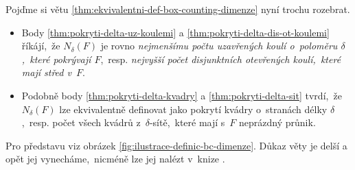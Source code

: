 Pojďme si větu \ref{thm:ekvivalentni-def-box-counting-dimenze} nyní trochu rozebrat.
\begin{itemize}
    \item Body \ref{thm:pokryti-delta-uz-koulemi} a \ref{thm:pokryti-delta-dis-ot-koulemi} říkájí,~že $N_\delta(F)$ je rovno \emph{nejmenšímu počtu uzavřených koulí o~poloměru $\delta$,~které pokrývají $F$},~resp. \emph{nejvyšší počet disjunktních otevřených koulí,~které mají střed v~$F$}.
    \item Podobně body \ref{thm:pokryti-delta-kvadry} a \ref{thm:pokryti-delta-sit} tvrdí,~že $N_\delta(F)$ lze ekvivalentně definovat jako pokrytí kvádry o~stranách délky $\delta$,~resp. počet všech kvádrů z~$\delta$-sítě,~které mají s~$F$ neprázdný průnik.
\end{itemize}
Pro představu viz obrázek \ref{fig:ilustrace-definic-bc-dimenze}. Důkaz věty je delší a opět jej vynecháme,~nicméně lze jej nalézt v~knize \citep[str. 30]{Falconer2014}.
